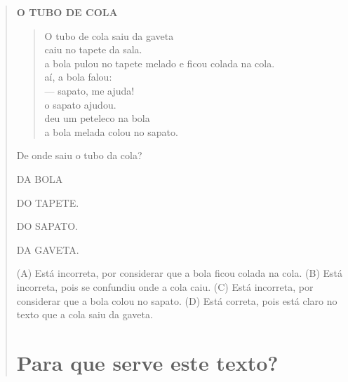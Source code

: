 \begin{verse}
\textbf{O TUBO DE COLA}

\begin{verse}
O tubo de cola saiu da gaveta\\
caiu no tapete da sala.\\
a bola pulou no tapete melado e ficou colada na cola.\\
aí, a bola falou:\\
--- sapato, me ajuda!\\
o sapato ajudou.\\
deu um peteleco na bola\\
a bola melada colou no sapato.
\end{verse}



De onde saiu o tubo da cola?

\begin{minipage}{.5\textwidth}
\begin{escolha}
\item DA BOLA

\item DO TAPETE.

\item DO SAPATO.

\item DA GAVETA.
\end{escolha}
\end{minipage}

(A) Está incorreta, por considerar que a bola ficou colada na cola.
(B) Está incorreta, pois se confundiu onde a cola caiu.
(C) Está incorreta, por considerar que a bola colou no sapato.
(D) Está correta, pois está claro no texto que a cola saiu da gaveta.

\chapter{Para que serve este texto?}



\end{verse}
